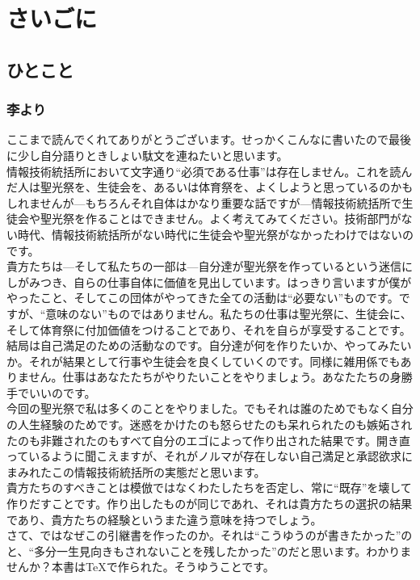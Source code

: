 \documentclass[a4paper]{ltjsreport}
\newcommand{\Chapter}[1]{\chapter{#1}\thispagestyle{fancy}}
\begin{document}
\Chapter{さいごに}
\section{ひとこと}
\subsection{李より}
ここまで読んでくれてありがとうございます。せっかくこんなに書いたので最後に少し自分語りときしょい駄文を連ねたいと思います。
\\

情報技術統括所において文字通り``必須である仕事''は存在しません。これを読んだ人は聖光祭を、生徒会を、あるいは体育祭を、よくしようと思っているのかもしれませんが---もちろんそれ自体はかなり重要な話ですが---情報技術統括所で生徒会や聖光祭を作ることはできません。よく考えてみてください。技術部門がない時代、情報技術統括所がない時代に生徒会や聖光祭がなかったわけではないのです。
\\

貴方たちは---そして私たちの一部は---自分達が聖光祭を作っているという迷信にしがみつき、自らの仕事自体に価値を見出しています。はっきり言いますが僕がやったこと、そしてこの団体がやってきた全ての活動は``必要ない''ものです。ですが、``意味のない''ものではありません。私たちの仕事は聖光祭に、生徒会に、そして体育祭に付加価値をつけることであり、それを自らが享受することです。
\\

結局は自己満足のための活動なのです。自分達が何を作りたいか、やってみたいか。それが結果として行事や生徒会を良くしていくのです。同様に雑用係でもありません。仕事はあなたたちがやりたいことをやりましょう。あなたたちの身勝手でいいのです。
\\

今回の聖光祭で私は多くのことをやりました。でもそれは誰のためでもなく自分の人生経験のためです。迷惑をかけたのも怒らせたのも呆れられたのも嫉妬されたのも非難されたのもすべて自分のエゴによって作り出された結果です。開き直っているように聞こえますが、それがノルマが存在しない自己満足と承認欲求にまみれたこの情報技術統括所の実態だと思います。
\\

貴方たちのすべきことは模倣ではなくわたしたちを否定し、常に``既存''を壊して作りだすことです。作り出したものが同じであれ、それは貴方たちの選択の結果であり、貴方たちの経験というまた違う意味を持つでしょう。
\\

さて、ではなぜこの引継書を作ったのか。それは``こうゆうのが書きたかった''のと、``多分一生見向きもされないことを残したかった''のだと思います。わかりませんか？本書は\TeX で作られた。そうゆうことです。
\\
\end{document}
